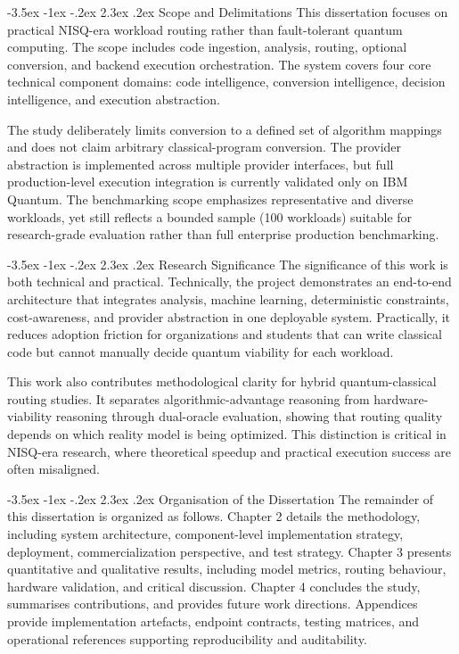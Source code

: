 \documentclass[12pt,a4paper]{report}
\makeatletter
\renewcommand\section{\@startsection{section}{1}{\z@}%
  {-3.5ex \@plus -1ex \@minus -.2ex}%
  {2.3ex \@plus.2ex}%
  {\normalfont\bfseries\fontsize{12pt}{16pt}\selectfont}}
\makeatother
\begin{document}
\section{Scope and Delimitations}
This dissertation focuses on practical NISQ-era workload routing rather than fault-tolerant quantum computing. The scope includes code ingestion, analysis, routing, optional conversion, and backend execution orchestration. The system covers four core technical component domains: code intelligence, conversion intelligence, decision intelligence, and execution abstraction.

The study deliberately limits conversion to a defined set of algorithm mappings and does not claim arbitrary classical-program conversion. The provider abstraction is implemented across multiple provider interfaces, but full production-level execution integration is currently validated only on IBM Quantum. The benchmarking scope emphasizes representative and diverse workloads, yet still reflects a bounded sample (100 workloads) suitable for research-grade evaluation rather than full enterprise production benchmarking.

\section{Research Significance}
The significance of this work is both technical and practical. Technically, the project demonstrates an end-to-end architecture that integrates analysis, machine learning, deterministic constraints, cost-awareness, and provider abstraction in one deployable system. Practically, it reduces adoption friction for organizations and students that can write classical code but cannot manually decide quantum viability for each workload.

This work also contributes methodological clarity for hybrid quantum-classical routing studies. It separates algorithmic-advantage reasoning from hardware-viability reasoning through dual-oracle evaluation, showing that routing quality depends on which reality model is being optimized. This distinction is critical in NISQ-era research, where theoretical speedup and practical execution success are often misaligned.

\section{Organisation of the Dissertation}
The remainder of this dissertation is organized as follows. Chapter 2 details the methodology, including system architecture, component-level implementation strategy, deployment, commercialization perspective, and test strategy. Chapter 3 presents quantitative and qualitative results, including model metrics, routing behaviour, hardware validation, and critical discussion. Chapter 4 concludes the study, summarises contributions, and provides future work directions. Appendices provide implementation artefacts, endpoint contracts, testing matrices, and operational references supporting reproducibility and auditability.
\end{document}
